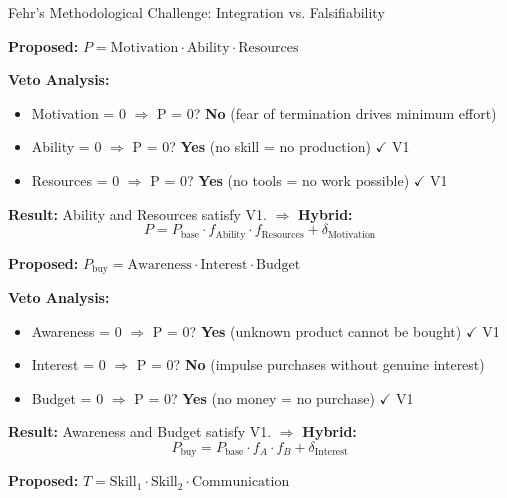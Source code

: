 \begin{chapter}{Fehr's Methodological Challenge: Integration vs. Falsifiability}
\begin{example}
\label{ex:exc-productivity}
\textbf{Proposed:} $P = \text{Motivation} \cdot \text{Ability} \cdot \text{Resources}$

\textbf{Veto Analysis:}
\begin{itemize}[noitemsep]
    \item Motivation = 0 $\Rightarrow$ P = 0? \textbf{No} (fear of termination drives minimum effort)
    \item Ability = 0 $\Rightarrow$ P = 0? \textbf{Yes} (no skill = no production) $\checkmark$ V1
    \item Resources = 0 $\Rightarrow$ P = 0? \textbf{Yes} (no tools = no work possible) $\checkmark$ V1
\end{itemize}

\textbf{Result:} Ability and Resources satisfy V1. $\Rightarrow$ \textbf{Hybrid:}
\begin{equation}
P = P_{\text{base}} \cdot f_{\text{Ability}} \cdot f_{\text{Resources}} + \delta_{\text{Motivation}}
\end{equation}
\end{example}

\begin{example}
\label{ex:exc-purchase}
\textbf{Proposed:} $P_{\text{buy}} = \text{Awareness} \cdot \text{Interest} \cdot \text{Budget}$

\textbf{Veto Analysis:}
\begin{itemize}[noitemsep]
    \item Awareness = 0 $\Rightarrow$ P = 0? \textbf{Yes} (unknown product cannot be bought) $\checkmark$ V1
    \item Interest = 0 $\Rightarrow$ P = 0? \textbf{No} (impulse purchases without genuine interest)
    \item Budget = 0 $\Rightarrow$ P = 0? \textbf{Yes} (no money = no purchase) $\checkmark$ V1
\end{itemize}

\textbf{Result:} Awareness and Budget satisfy V1. $\Rightarrow$ \textbf{Hybrid:}
\begin{equation}
P_{\text{buy}} = P_{\text{base}} \cdot f_A \cdot f_B + \delta_{\text{Interest}}
\end{equation}
\end{example}

\begin{example}
\label{ex:exc-team}
\textbf{Proposed:} $T = \text{Skill}_1 \cdot \text{Skill}_2 \cdot \text{Communication}$


\end{example}
\end{chapter}
